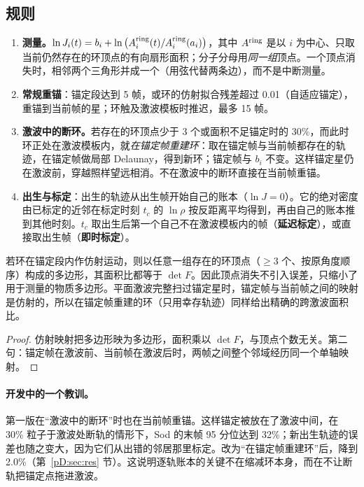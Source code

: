 \subsection{规则}
\begin{enumerate}
\item \textbf{测量。}$\ln J_i(t)=b_i+\ln\big(A_i^{\rm ring}(t)/A_i^{\rm ring}(a_i)\big)$，其中 $A^{\rm ring}$ 是以 $i$ 为中心、只取当前仍然存在的环顶点的有向扇形面积；分子分母用\emph{同一组}顶点。一个顶点消失时，相邻两个三角形并成一个（用弦代替两条边），而不是中断测量。
\item \textbf{常规重锚}：锚定段达到 5 帧，或环的仿射拟合残差超过 0.01（自适应锚定），重锚到当前帧的星；环触及激波模板时推迟，最多 15 帧。
\item \textbf{激波中的断环。}若存在的环顶点少于 3 个或面积不足锚定时的 30\%，而此时环正处在激波模板内，就\emph{在锚定帧重建环}：取在锚定帧与当前帧都存在的轨迹，在锚定帧做局部 Delaunay，得到新环；锚定帧与 $b_i$ 不变。这样锚定星仍在激波前，穿越照样望远相消。不在激波中的断环直接在当前帧重锚。
\item \textbf{出生与标定}：出生的轨迹从出生帧开始自己的账本（$\ln J=0$）。它的绝对密度由已标定的近邻在标定时刻 $t_c$ 的 $\ln\rho$ 按反距离平均得到，再由自己的账本推到其他时刻。$t_c$ 取出生后第一个自己不在激波模板内的帧（\textbf{延迟标定}），或直接取出生帧（\textbf{即时标定}）。
\end{enumerate}

\begin{proposition}[缩减环的精确性]
若环在锚定段内作仿射运动，则以任意一组存在的环顶点（$\ge3$ 个、按原角度顺序）构成的多边形，其面积比都等于 $\det F$。因此顶点消失不引入误差，只缩小了用于测量的物质多边形。平面激波完整扫过锚定星时，锚定帧与当前帧之间的映射是仿射的，所以在锚定帧重建的环（只用幸存轨迹）同样给出精确的跨激波面积比。
\end{proposition}
\begin{proof}
仿射映射把多边形映为多边形，面积乘以 $\det F$，与顶点个数无关。第二句：锚定帧在激波前、当前帧在激波后时，两帧之间整个邻域经历同一个单轴映射。
\end{proof}

\paragraph{开发中的一个教训。}第一版在“激波中的断环”时也在当前帧重锚。这样锚定被放在了激波中间，在 30\% 粒子于激波处断轨的情形下，Sod 的末帧 95 分位达到 32\%；新出生轨迹的误差也随之变大，因为它们从出错的邻居那里标定。改为“在锚定帧重建环”后，降到 2.0\%（第~\ref{pD:sec:res} 节）。这说明逐轨账本的关键不在缩减环本身，而在不让断轨把锚定点拖进激波。

